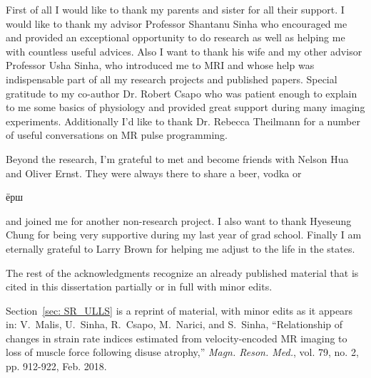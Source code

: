 \begin{frontmatter}
%
\tableofcontents
\listoffigures  %
\listoftables   %



%
%
\begin{acknowledgements}
First of all I would like to thank my parents and sister for all their support.
I would like to thank my advisor Professor Shantanu Sinha who encouraged me and provided an exceptional opportunity to do research as well as helping me with countless useful advices.
Also I want to thank his wife and my other advisor Professor Usha Sinha, who introduced me to MRI and whose help was indispensable part of all my research projects and published papers.
Special gratitude to my co-author Dr. Robert Csapo who was patient enough to explain to me some basics of physiology and provided great support during many imaging experiments.
Additionally I'd like to thank Dr. Rebecca Theilmann for a number of useful conversations on MR pulse programming.

Beyond the research, I'm grateful to met and become friends with Nelson Hua and Oliver Ernst.
They were always there to share a beer, vodka or \begin{otherlanguage}{russian}
ёрш
\end{otherlanguage} and joined me for another non-research project.
I also want to thank Hyeseung Chung for being very supportive during my last year of grad school.
Finally I am eternally grateful to Larry Brown for helping me adjust to the life in the states.

The rest of the acknowledgments recognize an already published material that is cited in this dissertation partially or in full with minor edits.

Section~\ref{sec: SR_ULLS} is a reprint of material, with minor edits as it appears in: V.~Malis, U.~Sinha, R.~Csapo, M.~Narici, and S.~Sinha, ``Relationship of changes in strain rate indices estimated from velocity-encoded MR imaging to loss of muscle force following disuse atrophy,'' \emph{Magn. Reson. Med.}, vol. 79, no. 2, pp. 912-922, Feb. 2018.


\end{acknowledgements}
\end{frontmatter}
